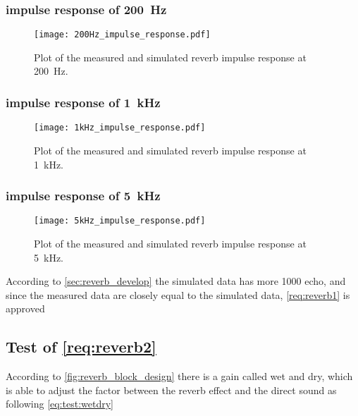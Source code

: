 \subsubsection*{impulse response of \SI{200}{\hertz}}

\begin{figure}[htbp!]
    \centering
        \texttt{[image: 200Hz\_impulse\_response.pdf]}
        \caption{Plot of the measured and simulated \gls{reverb} impulse response at \SI{200}{\hertz}.}
        \label{fig:tests:reverb:200Hz}
  \end{figure}

  \newpage
\subsubsection*{impulse response of \SI{1}{\kilo\hertz}}

\begin{figure}[htbp!]
    \centering
        \texttt{[image: 1kHz\_impulse\_response.pdf]}
        \caption{Plot of the measured and simulated \gls{reverb} impulse response at \SI{1}{\kilo\hertz}.}
        \label{fig:tests:reverb:1kHz}
  \end{figure}
  
  
 \subsubsection*{impulse response of \SI{5}{\kilo\hertz}}

\begin{figure}[htbp!]
    \centering
        \texttt{[image: 5kHz\_impulse\_response.pdf]}
        \caption{Plot of the measured and simulated \gls{reverb} impulse response at \SI{5}{\kilo\hertz}.}
        \label{fig:tests:reverb:5kHz}
  \end{figure}
  
According to \autoref{sec:reverb_develop} the simulated data has more 1000 echo, and since the measured data are closely equal to the simulated data, \autoref{req:reverb1} is approved
  
  
\subsection{Test of \autoref{req:reverb2}}
According to \autoref{fig:reverb_block_design} there is a gain called wet and dry, which is able to adjust the factor between the \gls{reverb} effect and the direct sound as following \autoref{eq:test:wetdry}

